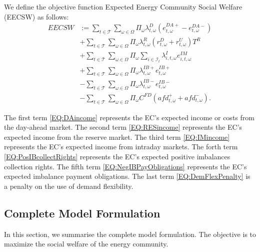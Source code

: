 We define the objective function Expected Energy Community Social Welfare (EECSW) as follows:
\begin{subequations}
	\begin{align}
		EECSW & := \sum_{t \in \mathcal{T}} \sum_{\omega \in \Omega} \Pi_{\omega} \lambda^D_{t, \omega} (e^{DA+}_{t, \omega} - e^{DA-}_{t, \omega}) \label{EQ:DAincome} \\
		& + \sum_{t \in \mathcal{T}} \sum_{\omega \in \Omega} \Pi_{\omega} \lambda^R_{t, \omega} (r^D_{t, \omega} + r^U_{t, \omega}) T^R \label{EQ:RESincome} \\
		& + \sum_{t \in \mathcal{T}} \sum_{\omega \in \Omega} \Pi_{\omega} \sum_{i \in \mathcal{I}_t} \lambda^{I}_{i, t, \omega} e^{IM}_{i, t, \omega} \label{EQ:IMincome} \\
		& + \sum_{t \in \mathcal{T}} \sum_{\omega \in \Omega} \Pi_{\omega} \lambda^{IB+}_{t, \omega} e^{IB+}_{t, \omega} \label{EQ:PosIBcollectRights} \\
		& - \sum_{t \in \mathcal{T}} \sum_{\omega \in \Omega} \Pi_{\omega} \lambda^{IB-}_{t, \omega} e^{IB-}_{t, \omega} \label{EQ:NegIBPayObligations} \\
		& - \sum_{t \in \mathcal{T}} \sum_{\omega \in \Omega} \Pi_{\omega} C^{FD} (afd^+_{t, \omega} + afd^-_{t, \omega}). \label{EQ:DemFlexPenalty}
	\end{align}
	\label{EQ:EECSW}
\end{subequations}

The first term \eqref{EQ:DAincome} represents the EC's expected income or costs from the day-ahead market. The second term \eqref{EQ:RESincome} represents the EC's expected income from the reserve market. The third term \eqref{EQ:IMincome} represents the EC's expected income from intraday markets. The forth term \eqref{EQ:PosIBcollectRights} represents the EC's expected positive imbalances collection rights. The fifth term \eqref{EQ:NegIBPayObligations} represents the EC's expected imbalance payment obligations. The last term \eqref{EQ:DemFlexPenalty} is a penalty on the use of demand flexibility.

\subsection{Complete Model Formulation}
\label{SEC:CompleteModelFormulation}

In this section, we summarise the complete model formulation. The objective is to maximize the social welfare of the energy community.

